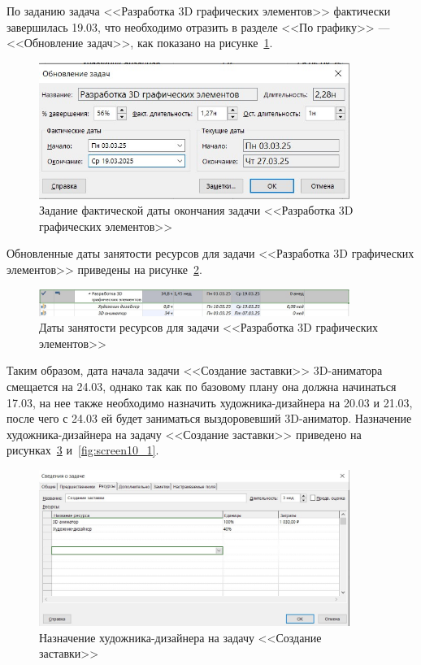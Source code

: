 По заданию задача <<Разработка 3D графических элементов>> фактически завершилась 19.03, что необходимо отразить в разделе <<По графику>> --- <<Обновление задач>>, как показано на рисунке~\ref{fig:screen9}.

\begin{figure}[H]
	\centering
	\includegraphics[width=0.9\textwidth]{img/lab4/screen9.jpg}
	\caption{Задание фактической даты окончания задачи <<Разработка 3D графических элементов>>}
	\label{fig:screen9}
\end{figure}

Обновленные даты занятости ресурсов для задачи <<Разработка 3D графических элементов>> приведены на рисунке~\ref{fig:screen10}.

\begin{figure}[H]
	\centering
	\includegraphics[width=0.9\textwidth]{img/lab4/screen10.jpg}
	\caption{Даты занятости ресурсов для задачи <<Разработка 3D графических элементов>>}
	\label{fig:screen10}
\end{figure}

Таким образом, дата начала задачи <<Создание заставки>> 3D-аниматора смещается на 24.03, однако так как по базовому плану она должна начинаться 17.03, на нее также необходимо назначить художника-дизайнера на 20.03 и 21.03, после чего с 24.03 ей будет заниматься выздоровевший 3D-аниматор.
Назначение художника-дизайнера на задачу <<Создание заставки>> приведено на рисунках~\ref{fig:screen33} и~\ref{fig:screen10_1}.

\begin{figure}[H]
	\centering
	\includegraphics[width=0.9\textwidth]{img/lab4/screen33.jpg}
	\caption{Назначение художника-дизайнера на задачу <<Создание заставки>>}
	\label{fig:screen33}
\end{figure}


